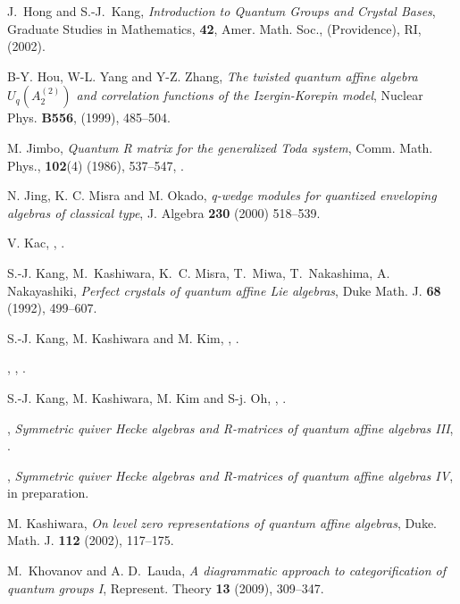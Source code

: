 \documentclass[11pt, leqno]{amsart}
\theoremstyle{definition}
\numberwithin{equation}{section}
\begin{document}
\begin{thebibliography}{99}
 J.~Hong and S.-J.~Kang,
\emph{Introduction to Quantum Groups and Crystal Bases},
Graduate Studies in Mathematics, \textbf{42}, Amer. Math. Soc., (Providence), RI, (2002).

B-Y. Hou, W-L. Yang and Y-Z. Zhang, {\it The twisted quantum affine algebra
$U_q(A^{(2)}_2)$ and correlation functions of the Izergin-Korepin model}, Nuclear Phys. {\bf B556}, (1999), 485--504.

M. Jimbo, {\it Quantum R matrix for the generalized Toda system},
Comm. Math. Phys., {\bf102}(4) (1986), 537--547, .

N. Jing, K. C. Misra and M. Okado, {\it q-wedge modules for
quantized enveloping algebras of classical type}, J. Algebra {\bf
230} (2000) 518--539.

 V. Kac,
,
.

S.-J. Kang, M.~Kashiwara, K.~C. Misra, T.~Miwa, T.~Nakashima, A.
Nakayashiki,
 \newblock \emph{Perfect crystals of quantum affine {L}ie algebras},
Duke Math. J. \textbf{68} (1992), 499--607.

 S.-J. Kang, M. Kashiwara and  M. Kim,
,
.

 \bysame,
,
.

 S.-J. Kang, M. Kashiwara, M. Kim and S-j. Oh,
, .

 \bysame,
{\it Symmetric quiver Hecke algebras and R-matrices of quantum affine algebras III},
.

\bysame,
{\it Symmetric quiver Hecke algebras and R-matrices of quantum affine algebras IV},
in preparation.

M. Kashiwara, {\it On level zero representations of quantum affine
algebras}, Duke. Math. J. {\bf112} (2002), 117--175.

M.~Khovanov and A. D.~Lauda, \emph{A diagrammatic approach to categorification of quantum groups
  {I}}, Represent. Theory \textbf{13} (2009), 309--347.


\end{thebibliography}
\end{document}
